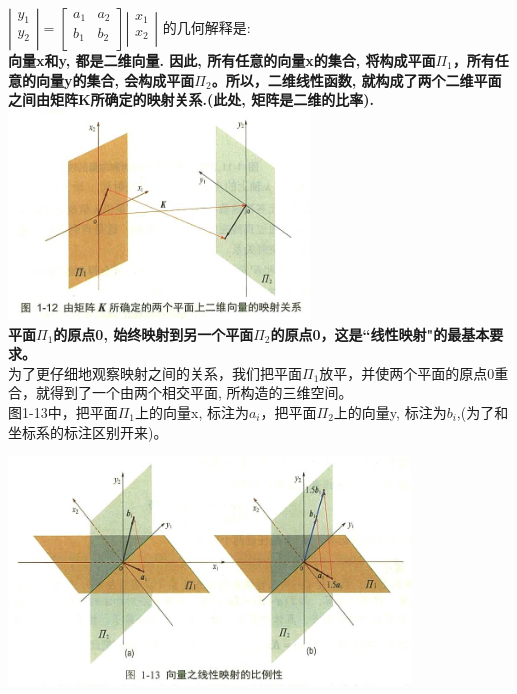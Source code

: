 \documentclass[UTF8]{ctexart}
\begin{document}
\begin{myEnvSample}
$
\left| \begin{array}{l}
	y_1\\
	y_2\\
\end{array} \right|=\left[ \begin{matrix}
	a_1&		a_2\\
	b_1&		b_2\\
\end{matrix} \right] \left| \begin{array}{l}
	x_1\\
	x_2\\
\end{array} \right|
$ 的几何解释是:\\
\textbf{向量x和y, 都是二维向量. 因此, 所有任意的向量x的集合, 将构成平面$\varPi _1$，所有任意的向量y的集合, 会构成平面$\varPi _2$。所以，二维线性函数, 就构成了两个二维平面之间由矩阵K所确定的映射关系.(此处, 矩阵是二维的比率).} \\

\includegraphics[width=0.6\textwidth]{img/0119.png}\\

\textbf{平面$\varPi _1$的原点0, 始终映射到另一个平面$\varPi _2$的原点0，这是``线性映射"的最基本要求。}\\

为了更仔细地观察映射之间的关系，我们把平面$\varPi _1$放平，并使两个平面的原点0重合，就得到了一个由两个相交平面, 所构造的三维空间。\\

图1-13中，把平面$\varPi _1$上的向量x, 标注为$a_i$，把平面$\varPi _2$上的向量y, 标注为$b_i$,(为了和坐标系的标注区别开来)。

\includegraphics[width=0.8\textwidth]{img/0120.png}\\


\end{myEnvSample}
\end{document}
